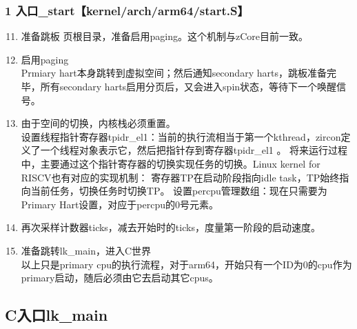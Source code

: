 \documentclass[
8pt, %
]{beamer}
\begin{document}
	\begin{frame}
		\frametitle{1 入口\_start【kernel/arch/arm64/start.S】}
		\begin{enumerate}\setcounter{enumi}{10}
			\item 准备跳板 页根目录，准备启用paging。这个机制与zCore目前一致。
			\item 启用paging\\
			Prmiary hart本身跳转到虚拟空间；然后通知secondary harts，跳板准备完毕，所有secondary harts启用分页后，又会进入spin状态，等待下一个唤醒信号。
			\item 由于空间的切换，内核栈必须重置。\\
			设置线程指针寄存器tpidr\_el1：当前的执行流相当于第一个kthread，zircon定义了一个线程对象表示它，然后把指针存到寄存器tpidr\_el1 。
			将来运行过程中，主要通过这个指针寄存器的切换实现任务的切换。Linux kernel for RISCV也有对应的实现机制：
			寄存器TP在启动阶段指向idle task，TP始终指向当前任务，切换任务时切换TP。
			设置percpu管理数组：现在只需要为Primary Hart设置，对应于percpu的0号元素。
			\item 再次采样计数器ticks，减去开始时的ticks，度量第一阶段的启动速度。
			\item 准备跳转lk\_main，进入C世界\\
			以上只是primary cpu的执行流程，对于arm64，开始只有一个ID为0的cpu作为primary启动，随后必须由它去启动其它cpus。
		\end{enumerate}
	\end{frame}

	\subsection{C入口lk\_main}
	
\end{document}
